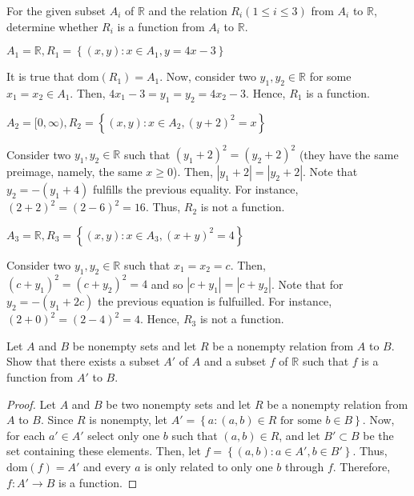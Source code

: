 \documentclass[12pt]{article}
\newcommand{\R}{\mathbb{R}}
\newenvironment{problem}[2][Problem]{\begin{trivlist} \item[\hskip \labelsep {\bfseries #1}\hskip \labelsep {\bfseries #2.}]}{\end{trivlist}}
\newenvironment{solution}[2][Solution]{\begin{trivlist} \item[\hskip \labelsep {\bfseries #1}\hskip \labelsep {\bfseries #2.}]}{\end{trivlist}}
\begin{document}
 \begin{problem}{4}
   For the given subset $A_{i}$ of $\R$ and the relation $R_{i}(1\leq i\leq3)$ from $A_{i}$ to $\R$, determine whether $R_{i}$ is a function from $A_{i}$ to $\R$. 
   \begin{enumerate}[label=(\alph*)]
     \item $A_{1} = \R, R_{1}=\left\{ (x,y):x\in A_{1}, y=4x-3 \right\}$
       \begin{solution}{a}
	 It is true that $\text{dom}(R_{1}) = A_{1}$. Now, consider two $y_{1},y_{2}\in \R$ for some $x_{1}=x_{2}\in A_{1}$. Then, $4x_{1}-3=y_{1}=y_{2}=4x_{2}-3$. Hence, $R_{1}$ is a function.	  
       \end{solution}
     \item $A_{2} = [0,\infty), R_{2}=\left\{ (x,y):x\in A_{2}, (y+2)^{2}=x \right\}$
       \begin{solution}{b}
	 Consider two $y_{1},y_{2}\in \R$ such that $(y_{1}+2)^{2}=(y_{2}+2)^{2}$ (they have the same preimage, namely, the same $x\geq 0$). Then, $|y_{1}+2|=|y_{2}+2|$. Note that $y_{2}=-(y_{1}+4)$ fulfills the previous equality. For instance, $(2+2)^{2}=(2-6)^{2}=16$. Thus, $R_{2}$ is not  a function.
       \end{solution}
     \item $A_{3} = \R, R_{3}=\left\{ (x,y):x\in A_{3}, (x+y)^{2}=4 \right\}$
       \begin{solution}{c}
	 Consider two $y_{1},y_{2}\in \R$ such that $x_{1}=x_{2}=c$. Then, $(c+y_{1})^{2}=(c+y_{2})^{2}=4$ and so $|c+y_{1}|=|c+y_{2}|$. Note that for $y_{2} = -(y_{1}+2c)$ the previous equation is fulfuilled. For instance, $(2+0)^{2}=(2-4)^{2}=4$. Hence, $R_{3}$ is not a function. 
	 
       \end{solution}
   \end{enumerate}
 \end{problem}

 \begin{problem}{5}
   Let $A$ and $B$ be nonempty sets and let $R$ be a nonempty relation from $A$ to $B$. Show that there exists a subset $A'$ of $A$ and a subset $f$ of $\R$ such that $f$ is a function from $A'$ to $B$.     
   \begin{proof}
     Let $A$ and $B$ be two nonempty sets and let $R$ be a nonempty relation from $A$ to $B$. Since $R$ is nonempty, let $A'=\left\{a:(a,b)\in R \text{ for some }b\in B \right\}$. Now, for each $a'\in A'$ select only one $b$ such that $(a,b)\in R$, and let $B'\subset B$ be the set containing these elements. Then, let $f=\left\{(a,b):a\in A', b\in B'\right\}$. Thus, $\text{dom}(f) = A'$ and every $a$ is only related to only one $b$ through $f$. Therefore, $f:A'\to B$ is a function.
    \end{proof}
 \end{problem}
\end{document}
